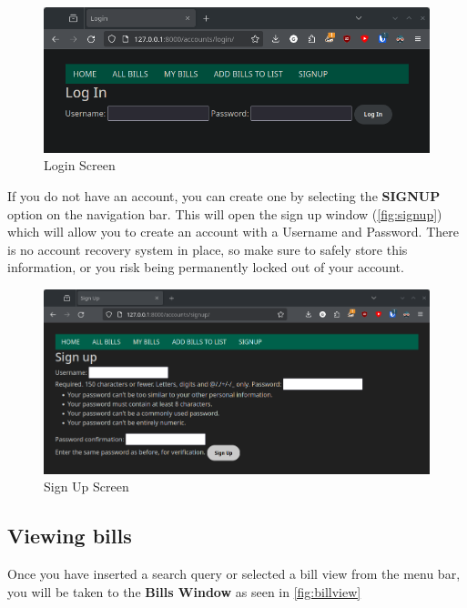 \documentclass{article}
\begin{document}
\begin{figure}[H]
\includegraphics[width=\textwidth]{login.png}
\caption{Login Screen}
\label{fig:login}
\end{figure}

If you do not have an account, you can create one by selecting the \textbf{SIGNUP} option on the navigation bar. This will open the sign up window (\autoref{fig:signup}) which will allow you to create an account with a Username and Password. There is no account recovery system in place, so make sure to safely store this information, or you risk being permanently locked out of your account.

\begin{figure}[H]
\includegraphics[width=\textwidth]{signup.png}
\caption{Sign Up Screen}
\label{fig:signup}
\end{figure}

\subsection{Viewing bills}

Once you have inserted a search query or selected a bill view from the menu bar, you will be taken to the \textbf{Bills Window} as seen in \autoref{fig:billview}
\end{document}
